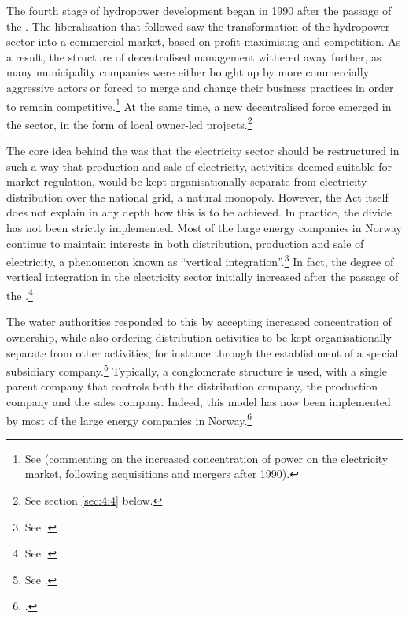 The fourth stage of hydropower development began in 1990 after the passage of the \cite{ea90}. The liberalisation that followed saw the transformation of the hydropower sector into a commercial market, based on profit-maximising and competition. As a result, the structure of decentralised management withered away further, as many municipality companies were either bought up by more commercially aggressive actors or forced to merge and change their business practices in order to remain competitive.\footnote{See \cite[583]{bibow03} (commenting on the increased concentration of power on the electricity market, following acquisitions and mergers after 1990).} At the same time, a new decentralised force emerged in the sector, in the form of local owner-led projects.\footnote{See section \ref{sec:4:4} below.}

The core idea behind the \cite{ea90} was that the electricity sector should be restructured in such a way that production and sale of electricity, activities deemed suitable for market regulation, would be kept organisationally separate from electricity distribution over the national grid, a natural monopoly. However, the Act itself does not explain in any depth how this is to be achieved. In practice, the divide has not been strictly implemented. Most of the large energy companies in Norway continue to maintain interests in both distribution, production and sale of electricity, a phenomenon known as ``vertical integration''.\footnote{See \cite[580-583]{bibow03}.} In fact, the degree of vertical integration in the electricity sector initially increased after the passage of the \cite{ea90}.\footnote{See \cite[583]{bibow03}.}


The water authorities responded to this by accepting increased concentration of ownership, while also ordering distribution activities to be kept organisationally separate from other activities, for instance through the establishment of a special subsidiary company.\footnote{See \cite[581-582]{bibow03}.} Typically, a conglomerate structure is used, with a single parent company that controls both the distribution company, the production company and the sales company. Indeed, this model has now been implemented by most of the large energy companies in Norway.\footcite[582]{bibow03}

